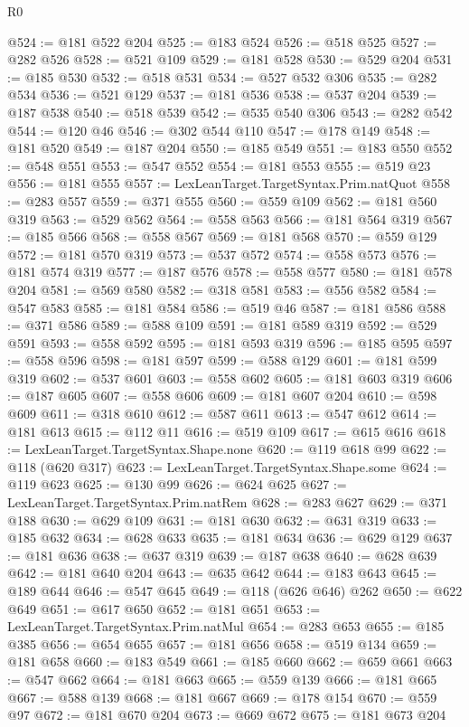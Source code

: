 \begin{lexlean}{R0}
\begin{coremodule}
@524 := @181 @522 @204
@525 := @183 @524
@526 := @518 @525
@527 := @282 @526
@528 := @521 @109
@529 := @181 @528
@530 := @529 @204
@531 := @185 @530
@532 := @518 @531
@534 := @527 @532 @306
@535 := @282 @534
@536 := @521 @129
@537 := @181 @536
@538 := @537 @204
@539 := @187 @538
@540 := @518 @539
@542 := @535 @540 @306
@543 := @282 @542
@544 := @120 @46
@546 := @302 @544 @110
@547 := @178 @149
@548 := @181 @520
@549 := @187 @204
@550 := @185 @549
@551 := @183 @550
@552 := @548 @551
@553 := @547 @552
@554 := @181 @553
@555 := @519 @23
@556 := @181 @555
@557 := LexLeanTarget.TargetSyntax.Prim.natQuot
@558 := @283 @557
@559 := @371 @555
@560 := @559 @109
@562 := @181 @560 @319
@563 := @529 @562
@564 := @558 @563
@566 := @181 @564 @319
@567 := @185 @566
@568 := @558 @567
@569 := @181 @568
@570 := @559 @129
@572 := @181 @570 @319
@573 := @537 @572
@574 := @558 @573
@576 := @181 @574 @319
@577 := @187 @576
@578 := @558 @577
@580 := @181 @578 @204
@581 := @569 @580
@582 := @318 @581
@583 := @556 @582
@584 := @547 @583
@585 := @181 @584
@586 := @519 @46
@587 := @181 @586
@588 := @371 @586
@589 := @588 @109
@591 := @181 @589 @319
@592 := @529 @591
@593 := @558 @592
@595 := @181 @593 @319
@596 := @185 @595
@597 := @558 @596
@598 := @181 @597
@599 := @588 @129
@601 := @181 @599 @319
@602 := @537 @601
@603 := @558 @602
@605 := @181 @603 @319
@606 := @187 @605
@607 := @558 @606
@609 := @181 @607 @204
@610 := @598 @609
@611 := @318 @610
@612 := @587 @611
@613 := @547 @612
@614 := @181 @613
@615 := @112 @11
@616 := @519 @109
@617 := @615 @616
@618 := LexLeanTarget.TargetSyntax.Shape.none
@620 := @119 @618 @99
@622 := @118 (@620 @317)
@623 := LexLeanTarget.TargetSyntax.Shape.some
@624 := @119 @623
@625 := @130 @99
@626 := @624 @625
@627 := LexLeanTarget.TargetSyntax.Prim.natRem
@628 := @283 @627
@629 := @371 @188
@630 := @629 @109
@631 := @181 @630
@632 := @631 @319
@633 := @185 @632
@634 := @628 @633
@635 := @181 @634
@636 := @629 @129
@637 := @181 @636
@638 := @637 @319
@639 := @187 @638
@640 := @628 @639
@642 := @181 @640 @204
@643 := @635 @642
@644 := @183 @643
@645 := @189 @644
@646 := @547 @645
@649 := @118 (@626 @646) @262
@650 := @622 @649
@651 := @617 @650
@652 := @181 @651
@653 := LexLeanTarget.TargetSyntax.Prim.natMul
@654 := @283 @653
@655 := @185 @385
@656 := @654 @655
@657 := @181 @656
@658 := @519 @134
@659 := @181 @658
@660 := @183 @549
@661 := @185 @660
@662 := @659 @661
@663 := @547 @662
@664 := @181 @663
@665 := @559 @139
@666 := @181 @665
@667 := @588 @139
@668 := @181 @667
@669 := @178 @154
@670 := @559 @97
@672 := @181 @670 @204
@673 := @669 @672
@675 := @181 @673 @204

\end{coremodule}
\end{lexlean}

